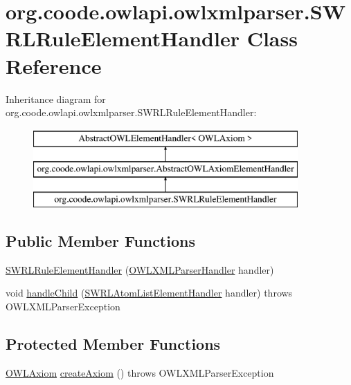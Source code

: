 \hypertarget{classorg_1_1coode_1_1owlapi_1_1owlxmlparser_1_1_s_w_r_l_rule_element_handler}{\section{org.\-coode.\-owlapi.\-owlxmlparser.\-S\-W\-R\-L\-Rule\-Element\-Handler Class Reference}
\label{classorg_1_1coode_1_1owlapi_1_1owlxmlparser_1_1_s_w_r_l_rule_element_handler}
}
Inheritance diagram for org.\-coode.\-owlapi.\-owlxmlparser.\-S\-W\-R\-L\-Rule\-Element\-Handler\-:\begin{figure}[H]
\begin{center}
\leavevmode
\includegraphics[height=3.000000cm]{classorg_1_1coode_1_1owlapi_1_1owlxmlparser_1_1_s_w_r_l_rule_element_handler}
\end{center}
\end{figure}
\subsection*{Public Member Functions}
\begin{DoxyCompactItemize}
\item 
\hyperlink{classorg_1_1coode_1_1owlapi_1_1owlxmlparser_1_1_s_w_r_l_rule_element_handler_a928898587b784b09bac435be241db3c5}{S\-W\-R\-L\-Rule\-Element\-Handler} (\hyperlink{classorg_1_1coode_1_1owlapi_1_1owlxmlparser_1_1_o_w_l_x_m_l_parser_handler}{O\-W\-L\-X\-M\-L\-Parser\-Handler} handler)
\item 
void \hyperlink{classorg_1_1coode_1_1owlapi_1_1owlxmlparser_1_1_s_w_r_l_rule_element_handler_a5e246ef036a3e4efc9b13274cf0559b1}{handle\-Child} (\hyperlink{classorg_1_1coode_1_1owlapi_1_1owlxmlparser_1_1_s_w_r_l_atom_list_element_handler}{S\-W\-R\-L\-Atom\-List\-Element\-Handler} handler)  throws O\-W\-L\-X\-M\-L\-Parser\-Exception 
\end{DoxyCompactItemize}
\subsection*{Protected Member Functions}
\begin{DoxyCompactItemize}
\item 
\hyperlink{interfaceorg_1_1semanticweb_1_1owlapi_1_1model_1_1_o_w_l_axiom}{O\-W\-L\-Axiom} \hyperlink{classorg_1_1coode_1_1owlapi_1_1owlxmlparser_1_1_s_w_r_l_rule_element_handler_a51c95264e3dbe59a868c0f1ddf705fd4}{create\-Axiom} ()  throws O\-W\-L\-X\-M\-L\-Parser\-Exception 
\end{DoxyCompactItemize}
